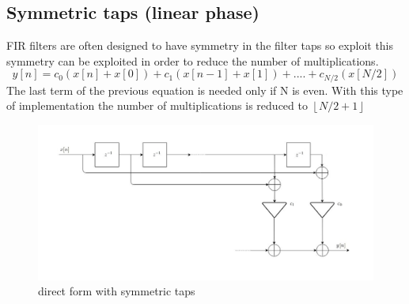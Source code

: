 \subsection{Symmetric taps (linear phase)}
FIR filters are often designed to have symmetry in the filter taps so exploit this symmetry can be exploited in order to reduce the number of multiplications.
$$y[n]= c_{0}(x[n]+x[0])+c_{1}(x[n-1]+x[1])+....+c_{N/2}(x[N/2])$$
The last term of the previous equation is needed only if N is even.
With this type of implementation the number of multiplications is reduced to $\left \lfloor N/2+1 \right \rfloor$
\begin{figure}[H]
    \centering
    \includegraphics[scale=0.45]{images/symmetryc.jpg}    
    \caption{direct form with symmetric taps}
    \label{fig:symmetric}
\end{figure}
